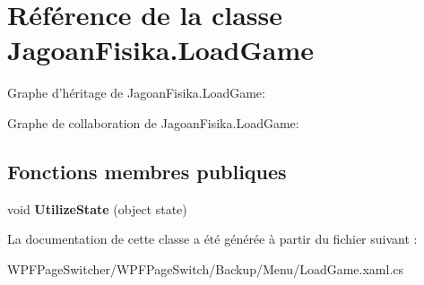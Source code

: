 \hypertarget{class_jagoan_fisika_1_1_load_game}{\section{Référence de la classe Jagoan\+Fisika.\+Load\+Game}
\label{class_jagoan_fisika_1_1_load_game}
}


Graphe d'héritage de Jagoan\+Fisika.\+Load\+Game\+:


Graphe de collaboration de Jagoan\+Fisika.\+Load\+Game\+:
\subsection*{Fonctions membres publiques}
\begin{DoxyCompactItemize}
\item 
\hypertarget{class_jagoan_fisika_1_1_load_game_acdb3122e0895037f40dc9d4e0a5c7855}{void {\bfseries Utilize\+State} (object state)}\label{class_jagoan_fisika_1_1_load_game_acdb3122e0895037f40dc9d4e0a5c7855}

\end{DoxyCompactItemize}


La documentation de cette classe a été générée à partir du fichier suivant \+:\begin{DoxyCompactItemize}
\item 
W\+P\+F\+Page\+Switcher/\+W\+P\+F\+Page\+Switch/\+Backup/\+Menu/Load\+Game.\+xaml.\+cs\end{DoxyCompactItemize}
